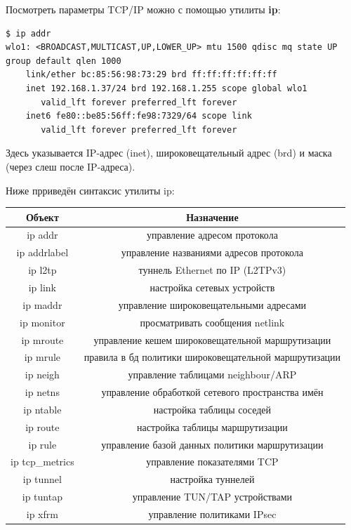\documentclass[a4paper]{article}
\begin{document}
	Посмотреть параметры TCP/IP можно с помощью утилиты \textbf{ip}:
	\begin{verbatim}
$ ip addr
wlo1: <BROADCAST,MULTICAST,UP,LOWER_UP> mtu 1500 qdisc mq state UP group default qlen 1000
    link/ether bc:85:56:98:73:29 brd ff:ff:ff:ff:ff:ff
    inet 192.168.1.37/24 brd 192.168.1.255 scope global wlo1
       valid_lft forever preferred_lft forever
    inet6 fe80::be85:56ff:fe98:7329/64 scope link 
       valid_lft forever preferred_lft forever
	\end{verbatim}
	
	Здесь указывается IP-адрес (inet), широковещательный адрес (brd) и маска (через слеш после IP-адреса).
	
	Ниже прриведён синтаксис утилиты ip:
	
	\begin{tabular}{|c|c|}
		\hline
			Объект&Назначение\\
		\hline
			ip addr & управление адресом протокола\\
			\hline
			ip addrlabel & управление названиями адресов протокола\\
			\hline
			ip l2tp & туннель Ethernet по IP (L2TPv3)\\
			\hline
			ip link & настройка сетевых устройств\\
			\hline
			ip maddr & управление широковещательными адресами\\
			\hline
			ip monitor & просматривать сообщения netlink\\
			\hline
			ip mroute & управление кешем широковещательной маршрутизации\\
			\hline
			ip mrule & правила в бд политики широковещательной маршрутизации\\
			\hline
			ip neigh & управление таблицами neighbour/ARP\\
			\hline
			ip netns & управление обработкой сетевого пространства имён\\
			\hline
			ip ntable &  настройка таблицы соседей\\
			\hline
			ip route & настройка таблицы маршрутизации\\
			\hline
			ip rule & управление базой данных политики маршрутизации\\
			\hline
			ip tcp\_metrics & управление показателями TCP\\
			\hline
			ip tunnel & настройка туннелей\\
			\hline
			ip tuntap & управление TUN/TAP устройствами\\
			\hline
			ip xfrm & управление политиками IPsec\\
			
			\hline
	\end{tabular}
		
\end{document}
